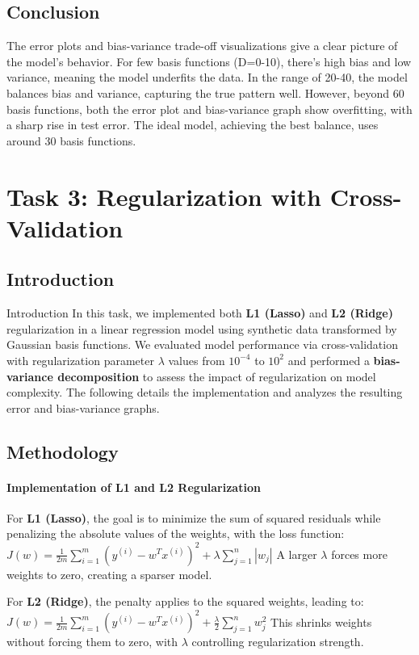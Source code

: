 \documentclass{article}
\begin{document}
\subsection{Conclusion}
The error plots and bias-variance trade-off visualizations give a clear picture of the model's behavior. For few basis functions (D=0-10), there's high bias and low variance, meaning the model underfits the data. In the range of 20-40, the model balances bias and variance, capturing the true pattern well. However, beyond 60 basis functions, both the error plot and bias-variance graph show overfitting, with a sharp rise in test error. The ideal model, achieving the best balance, uses around 30 basis functions.

\section{Task 3: Regularization with Cross-Validation}

\subsection{Introduction}
\noindent Introduction
In this task, we implemented both \textbf{L1 (Lasso)} and \textbf{L2 (Ridge)} regularization in a linear regression model using synthetic data transformed by Gaussian basis functions. We evaluated model performance via cross-validation with regularization parameter $\lambda$ values from $10^{-4}$ to $10^2$ and performed a \textbf{bias-variance decomposition} to assess the impact of regularization on model complexity. The following details the implementation and analyzes the resulting error and bias-variance graphs.


\subsection{Methodology}

\paragraph{Implementation of L1 and L2 Regularization}
For \textbf{L1 (Lasso)}, the goal is to minimize the sum of squared residuals while penalizing the absolute values of the weights, with the loss function:
$J(w) = \frac{1}{2m} \sum_{i=1}^{m} \left( y^{(i)} - w^T x^{(i)} \right)^2 + \lambda \sum_{j=1}^{n} \left| w_j \right|$
A larger $\lambda$ forces more weights to zero, creating a sparser model.

For \textbf{L2 (Ridge)}, the penalty applies to the squared weights, leading to:
$J(w)=\frac{1}{2 m} \sum_{i=1}^m\left(y^{(i)}-w^T x^{(i)}\right)^2+\frac{\lambda}{2} \sum_{j=1}^n w_j^2$
This shrinks weights without forcing them to zero, with $\lambda$ controlling regularization strength.
\end{document}
